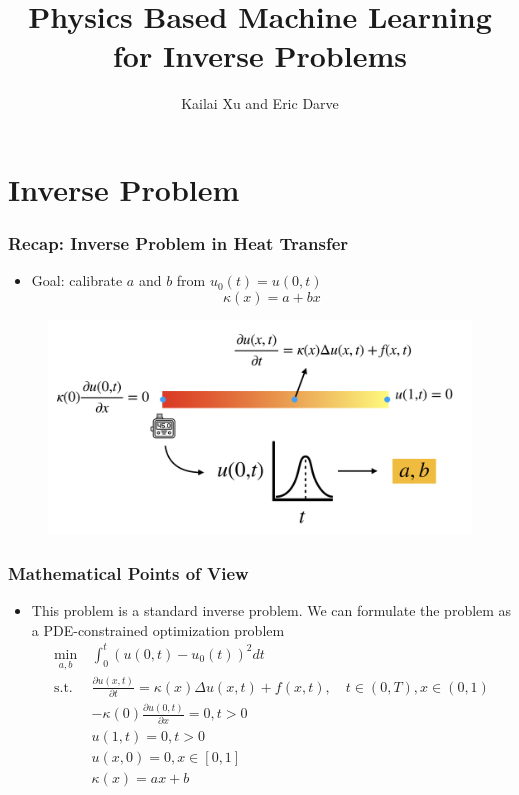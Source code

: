 \documentclass{beamer}
\title[Inverse Problem]{Physics Based Machine Learning for Inverse Problems} %
\author[CME 216]{Kailai Xu and Eric Darve} %
\date{}%
\begin{document}
\begin{frame}

\titlepage %

\end{frame}

\section{Inverse Problem}

\begin{frame}
	\frametitle{Recap: Inverse Problem in Heat Transfer}
	\begin{itemize}
\item Goal: calibrate $a$ and $b$ from $u_0(t) = u(0, t)$
$$\kappa(x) = a + bx$$
	\end{itemize}	
	\begin{figure}
		\centering
		\includegraphics[width=1.0\textwidth]{figures/measure}
	\end{figure}

\end{frame}

\begin{frame}
	\frametitle{Mathematical Points of View}
	\begin{itemize}
		\item This problem is a standard inverse problem. We can formulate the problem as a PDE-constrained optimization problem
		$$\begin{aligned}
\min_{a, b}\ & \int_{0}^t ( u(0, t)- u_0(t))^2 dt\\
\mathrm{s.t.}\ & \frac{\partial u(x, t)}{\partial t} = \kappa(x)\Delta u(x, t) + f(x, t), \quad t\in (0,T), x\in (0,1) \\
& -\kappa(0)\frac{\partial u(0,t)}{\partial x} = 0, t>0\\
& u(1, t) = 0, t>0\\
& u(x, 0) = 0, x\in [0,1]\\
& \kappa(x) = a x + b
\end{aligned}$$

	\end{itemize}
\end{frame}
\end{document}
